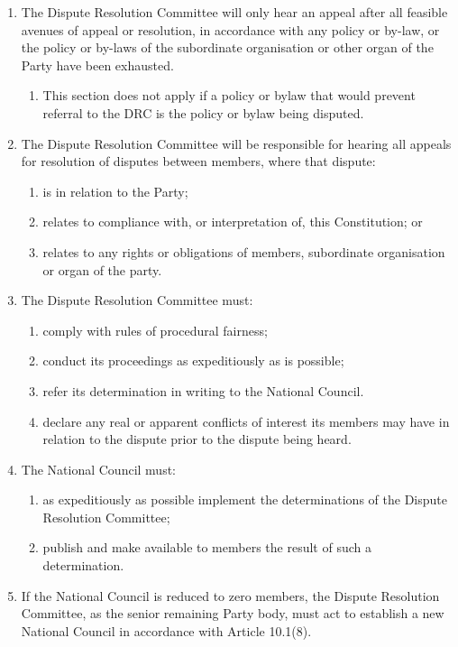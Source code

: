 \documentclass[a4paper,titlepage,8.5pt]{article}
\begin{document}
\begin{enumerate}
\item The Dispute Resolution Committee will only hear an appeal after all feasible avenues of appeal or resolution, in accordance with any policy or by-law, or the policy or by-laws of the subordinate organisation or other organ of the Party have been exhausted.
\begin{enumerate}
  \item This section does not apply if a policy or bylaw that would prevent referral to the DRC is the policy or bylaw being disputed.
\end{enumerate}
\item The Dispute Resolution Committee will be responsible for hearing all appeals for resolution of disputes between members, where that dispute:
\begin{enumerate}
\item is in relation to the Party;
\item relates to compliance with, or interpretation of, this Constitution; or
\item relates to any rights or obligations of members, subordinate organisation or organ of the party.
\end{enumerate}
\item The Dispute Resolution Committee must:
\begin{enumerate}
\item comply with rules of procedural fairness;
\item conduct its proceedings as expeditiously as is possible;
\item refer its determination in writing to the National Council.
\item declare any real or apparent conflicts of interest its members may have in relation to the dispute prior to the dispute being heard.
\end{enumerate}
\item The National Council must:
\begin{enumerate}
\item as expeditiously as possible implement the determinations of the Dispute Resolution Committee;
\item publish and make available to members the result of such a determination.
\end{enumerate}
\item If the National Council is reduced to zero members, the Dispute Resolution Committee, as the senior remaining Party body, must act to establish a new National Council in accordance with Article 10.1(8).
\end{enumerate}
\end{document}
